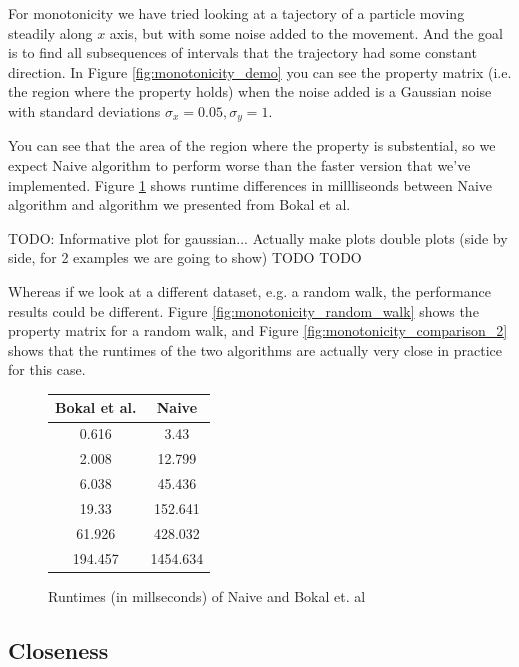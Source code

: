 \documentclass{article}
\begin{document}
For monotonicity we have tried looking at a tajectory of a particle
moving steadily along $x$ axis, but with some noise added to the
movement. And the goal is to find all subsequences of intervals
that the trajectory had some constant direction. In Figure
\ref{fig:monotonicity_demo} you can see the property matrix (i.e. the region where the property holds) when the noise added is a Gaussian
noise with standard deviations $\sigma_x = 0.05, \sigma_y = 1$.

You can see that the area of the region where the property is substential, so we expect Naive algorithm to perform worse than the faster version that we've implemented. 
Figure \ref{fig:monotonicity_comparison} shows runtime differences in millliseonds between Naive algorithm and algorithm we presented from Bokal et al.

TODO: Informative plot for gaussian... Actually make plots double plots (side by side, for 2 examples we are going to show) TODO TODO

Whereas if we look at a different dataset, e.g. a random walk, the
performance results could be different. Figure
\ref{fig:monotonicity_random_walk} shows the property matrix for a
random walk, and Figure \ref{fig:monotonicity_comparison_2} shows
that the runtimes of the two algorithms are actually very close in
practice for this case.

\begin{figure}[!ht]
    \centering
    \begin{tabular}{c|c}
      Bokal et al. & Naive \\
      \hline
      0.616     &    3.43 \\
      \hline
      2.008     &    12.799 \\
      \hline
      6.038     & 45.436 \\
      \hline
      19.33     & 152.641 \\
      \hline
      61.926    & 428.032 \\
      \hline
      194.457   & 1454.634
    \end{tabular}
    \caption{Runtimes (in millseconds) of Naive and Bokal et. al}
    \label{fig:monotonicity_comparison}
\end{figure}

\subsection{Closeness}
\end{document}
